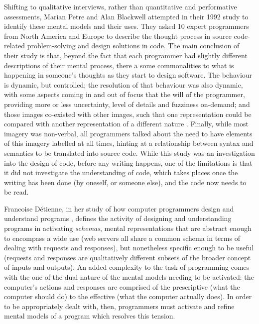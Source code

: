 Shifting to qualitative interviews, rather than quantitative and performative assessments, Marian Petre and Alan Blackwell attempted in their 1992 study to identify these mental models and their uses. They asked 10 expert programmers from North America and Europe to describe the thought process in source code-related problem-solving and design solutions in code. The main conclusion of their study is that, beyond the fact that each programmer had slightly different descriptions of their mental process, there a some commonalities to what is happening in someone's thoughts as they start to design software. The behaviour is dynamic, but controlled; the resolution of that behaviour was also dynamic, with some aspects coming in and out of focus that the will of the programmer, providing more or less uncertainty, level of details and fuzziness on-demand; and those images co-existed with other images, such that one representation could be compared with another representation of a different nature \citep{petre_glimpse_1997}. Finally, while most imagery was non-verbal, all programmers talked about the need to have elements of this imagery labelled at all times, hinting at a relationship between syntax and semantics to be translated into source code. While this study was an investigation into the design of code, before any writing happens, one of the limitations is that it did not investigate the understanding of code, which takes places once the writing has been done (by oneself, or someone else), and the code now needs to be read.

Francoise Détienne, in her study of how computer programmers design and understand programs \citep{detienne_software_2012}, defines the activity of designing and understanding programs in activating \emph{schemas}, mental representations that are abstract enough to encompass a wide use (web servers all share a common schema in terms of dealing with requests and responses), but nonetheless specific enough to be useful (requests and responses are qualitatively different subsets of the broader concept of inputs and outputs). An added complexity to the task of programming comes with the one of the dual nature of the mental models needing to be activated: the computer's actions and responses are comprised of the prescriptive (what the computer should do) to the effective (what the computer actually does). In order to be appropriately dealt with, then, programmers must activate and refine mental models of a program which resolves this tension.

